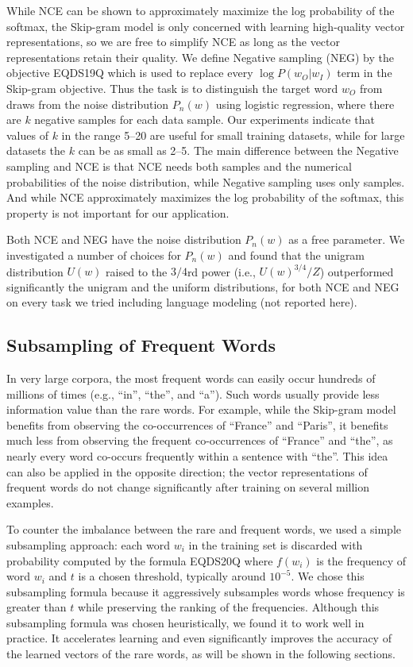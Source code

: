 \documentclass{article}
\begin{document}
While NCE can be shown to approximately maximize the log
probability of the softmax, the Skip-gram model is only concerned with learning
high-quality vector representations, so we are free to simplify NCE as
long as the vector representations retain their quality. We define Negative sampling (NEG)
by the objective
 EQDS19Q
which is used to replace every $\log P(w_O|w_I)$ term in the Skip-gram objective.
Thus the task is to distinguish the target word
$w_O$ from draws from the noise distribution $P_n(w)$ using logistic regression,
where there are $k$ negative
samples for each data sample. Our experiments indicate that values of $k$
in the range 5--20 are useful for small training datasets, while for large datasets
the $k$ can be as small as 2--5. The main difference between the Negative sampling and NCE is that NCE
needs both samples and the numerical probabilities of the noise distribution,
while Negative sampling uses only samples. And while NCE approximately maximizes the log probability
of the softmax, this property is not important for our application.

Both NCE and NEG have the noise distribution $P_n(w)$ as
a free parameter. We investigated a number of choices for $P_n(w)$
and found that the unigram distribution $U(w)$ raised to the $3/4$rd
power (i.e., $U(w)^{3/4}/Z$) outperformed significantly the unigram
and the uniform distributions, for both NCE and NEG on every task we tried
including language modeling (not reported here).

\subsection{Subsampling of Frequent Words}

In very large corpora, the most frequent words can easily occur hundreds of millions
of times (e.g., ``in'', ``the'', and ``a''). Such words usually
provide less information value than the rare words. For example, while the
Skip-gram model benefits from observing the co-occurrences of ``France'' and
``Paris'', it benefits much less from observing the frequent co-occurrences of ``France''
and ``the'', as nearly every word co-occurs frequently within a sentence
with ``the''. This idea can also be applied in the opposite
direction; the vector representations of frequent words do not change
significantly after training on several million examples.

To counter the imbalance between the rare and frequent words, we used a
simple subsampling approach: each word $w_i$ in the training set is
discarded with probability computed by the formula
EQDS20Q
where $f(w_i)$ is the frequency of word $w_i$ and $t$ is a chosen
threshold, typically around $10^{-5}$.  We chose this subsampling
formula because it aggressively subsamples words whose frequency is
greater than $t$ while preserving the ranking of the frequencies.
Although this subsampling formula was chosen heuristically, we found
it to work well in practice. It accelerates learning and even significantly improves
the accuracy of the learned vectors of the rare words, as will be shown in the following sections.
\end{document}
